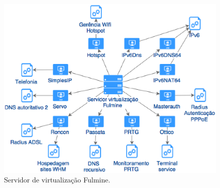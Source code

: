 \begin{figure}[h!]
 \centering
 \includegraphics[width=420px]{img/serv_fulmine.eps}
 \caption{Servidor de virtualização Fulmine.}
 \label{fig:serv_fulmine}
\end{figure}

